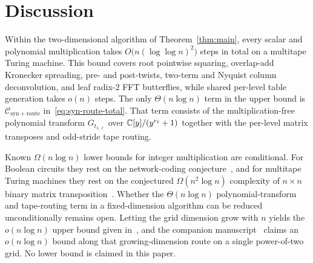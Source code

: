 \section{Discussion}\label{sec:discussion}

Within the two-dimensional algorithm of Theorem~\ref{thm:main}, every scalar and polynomial multiplication takes $O\bigl(n(\log\log n)^2\bigr)$ steps in total on a multitape Turing machine. This bound covers root pointwise squaring, overlap-add Kronecker spreading, pre- and post-twists, two-term and Nyquist column deconvolution, and leaf radix-$2$ FFT butterflies, while shared per-level table generation takes $o(n)$ steps. The only $\Theta(n \log n)$ term in the upper bound is $\mathcal{C}_{\mathrm{syn+route}}$ in~\eqref{eq:syn-route-total}. That term consists of the multiplication-free polynomial transform $G_{t_{1,\ell}}$ over $\mathbb{C}[y]/(y^{r_\ell} + 1)$ together with the per-level matrix transposes and odd-stride tape routing.

Known $\Omega(n \log n)$ lower bounds for integer multiplication are conditional. For Boolean circuits they rest on the network-coding conjecture~\cite{AFKL19}, and for multitape Turing machines they rest on the conjectured $\Omega(n^2 \log n)$ complexity of $n \times n$ binary matrix transposition~\cite{HvdH25}. Whether the $\Theta(n \log n)$ polynomial-transform and tape-routing term in a fixed-dimension algorithm can be reduced unconditionally remains open. Letting the grid dimension grow with $n$ yields the $o(n \log n)$ upper bound given in~\cite{OAI26}, and the companion manuscript~\cite{CLW26} claims an $o(n \log n)$ bound along that growing-dimension route on a single power-of-two grid. No lower bound is claimed in this paper.
